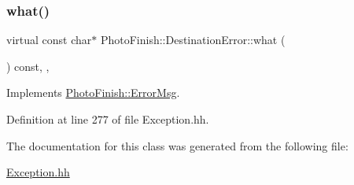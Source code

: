 \subsubsection{\texorpdfstring{what()}{what()}}
{\footnotesize\ttfamily virtual const char$\ast$ Photo\+Finish\+::\+Destination\+Error\+::what (\begin{DoxyParamCaption}{ }\end{DoxyParamCaption}) const\hspace{0.3cm}{\ttfamily [inline]}, {\ttfamily [virtual]}, {\ttfamily [noexcept]}}



Implements \hyperlink{class_photo_finish_1_1_error_msg_ae84614a0c68520a7ad11e699c1504e82}{Photo\+Finish\+::\+Error\+Msg}.



Definition at line 277 of file Exception.\+hh.



The documentation for this class was generated from the following file\+:\begin{DoxyCompactItemize}
\item 
\hyperlink{_exception_8hh}{Exception.\+hh}\end{DoxyCompactItemize}
